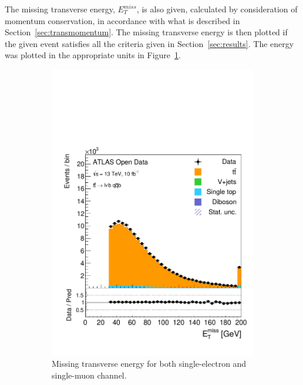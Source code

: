 \documentclass[12pt,a4paper]{article}
\numberwithin{equation}{section}
\begin{document}
The missing transverse energy, $E_T^{miss}$, is also given, calculated by
consideration of momentum conservation, in accordance with what is described in
Section~\ref{sec:transmomentum}. The missing transverse energy is then plotted
if the given event satisfies all the criteria given in
Section~\ref{sec:results}. The energy was plotted in the appropriate units in
Figure~\ref{fig:etmiss}.\\

\begin{figure}[t!]
    \centering
    \begin{subfigure}[t]{0.47\textwidth}
      \centering
      \includegraphics[width=1.0\textwidth]{figures/hist_etmiss}
      \caption{\label{fig:etmiss}Missing transverse energy for both
        single-electron and single-muon channel.}
    \end{subfigure}%
      \hfill{}
    \begin{subfigure}[t]{0.47\textwidth}

\end{subfigure}
\end{figure}
\end{document}
